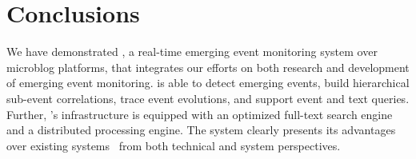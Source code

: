 
\section{Conclusions}
We have demonstrated \ring, a real-time emerging event monitoring system over microblog platforms, 
that integrates our efforts on both research and development of emerging event monitoring.
\ring is able to detect emerging events, build hierarchical sub-event correlations, trace event evolutions, and support event and text queries.
Further, \ring's infrastructure is equipped with an optimized full-text search engine and a distributed processing engine.
The system clearly presents its advantages over existing systems~\cite{mathioudakis2010twittermonitor,xie2014clear, schubert2014signitrend} from both technical and system perspectives.








\balance
